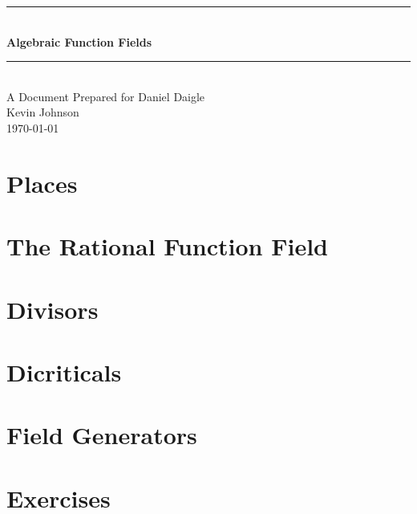 \documentclass{article}
\numberwithin{equation}{subsection}
\newcommand{\HRule}{\rule{\linewidth}{0.5mm}}
\begin{document}
\begin{titlepage}
\begin{center}

\HRule \\[0.4cm] %
{\huge \bfseries Algebraic Function Fields}\\[0.4cm] 
\HRule \\[0.8cm] %
{\large A Document Prepared for Daniel Daigle} \\[1.0cm]
{\large Kevin Johnson} \\[0.5cm]
{\large \today}\\

\end{center}
\end{titlepage}

\tableofcontents
\pagebreak



\section{Places}
	
\section{The Rational Function Field}
	
\section{Divisors}
	
\section{Dicriticals}
	
\section{Field Generators}
	
\section{Exercises}
	
\end{document}
